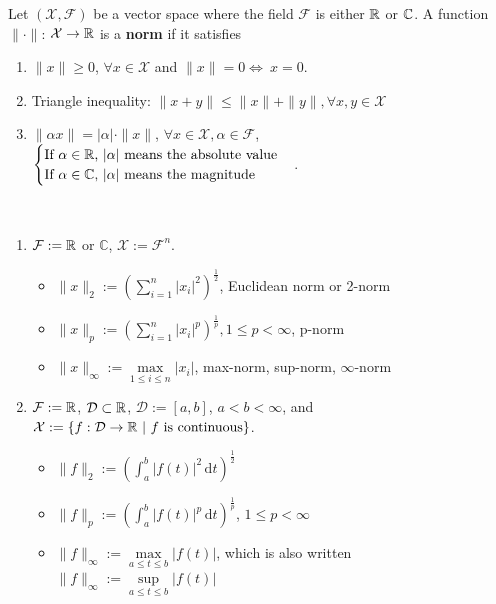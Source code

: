 \begin{definition}
 Let $(\mathcal{X}, \mathcal{F})$ be a vector space where the field $\mathcal{F} $ is either $\mathbb R$ or $\mathbb C$. A function $\| \cdot \|$: $\mathcal{X} \to\mathbb R  $ is a \textbf{norm} if it satisfies
 \begin{enumerate}
            \renewcommand{\labelenumi}{(\alph{enumi})}
        \setlength{\itemsep}{.1cm}
        \item $\| x \| \ge 0$, $\forall x \in \mathcal{X}$ and $\| x \| = 0 \iff \ x = 0$.
        \item Triangle inequality: $\| x+y \| \le \|x\| + \|y\|, \forall x, y \in \mathcal{X}$
        \item $\| \alpha x\| = |\alpha| \cdot \|x\|$, $\forall x\in \mathcal{X}, \alpha \in \mathcal{F}$,
            $
            \begin{cases}
                \textnormal{If } \alpha \in\mathbb R\textnormal{, } |\alpha| \textnormal{ means the absolute value}\\
                \textnormal{If } \alpha \in \mathbb{C}\textnormal{, } |\alpha| \textnormal{ means the magnitude}
            \end{cases}
            $.
    \end{enumerate}
     
\end{definition}


\begin{example} \mbox{ }
\begin{enumerate}
            \renewcommand{\labelenumi}{(\alph{enumi})}
        \setlength{\itemsep}{.1cm}
    \item $\mathcal{F} :=\mathbb R$ or $\mathbb{C}$, $\mathcal{X} := \mathcal{F}^n$.
	    \begin{itemize}
	        \item $\|x\|_2 := \left(\sum\limits_{i=1}^{n} |x_i|^2\right)^\frac{1}{2}$, Euclidean norm or 2-norm
	        \item $\|x\|_p := \left(\sum\limits_{i=1}^{n} |x_i|^p\right)^\frac{1}{p}, 1\le p < \infty$, p-norm
	        \item $\|x\|_\infty := \max\limits_{1 \le i \le n}|x_i|$, max-norm, sup-norm, $\infty$-norm
	    \end{itemize}
    \item $\mathcal{F} :=\mathbb R$, $\mathcal{D}\subset\mathbb R$, $\mathcal{D}:=[a, b]$, $a < b < \infty$, and $\mathcal{X} := \{f:\mathcal{D}\rightarrow\mathbb R\ |\ f \text{ is continuous} \}$.
        \begin{itemize}
            \item $\|f\|_2 := (\int_a^b \! |f(t)|^2 \, \mathrm{d}t)^\frac{1}{2}$
            \item $\|f\|_p := (\int_a^b \! |f(t)|^p \, \mathrm{d}t)^\frac{1}{p}$, $1 \le p <  \infty$
            \item $\|f\|_\infty := \max\limits_{a \le t \le b}|f(t)|$, which is also written $\|f\|_\infty := \sup \limits_{a \le t \le b} |f(t)|$
        \end{itemize}
\end{enumerate}
\end{example}


